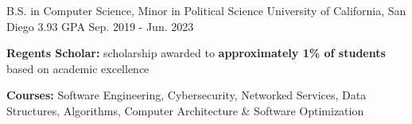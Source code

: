 

\begin{cventries}

    \cventry
    {B.S. in Computer Science, Minor in Political Science} %
    {University of California, San Diego} %
    {3.93 GPA} %
    {Sep. 2019 - Jun. 2023} %
    {
      \begin{cvitems} %
        \item {\textbf{Regents Scholar:} scholarship awarded to \textbf{approximately 1\% of students} based on academic excellence}
        \item {\textbf{Courses:} Software Engineering, Cybersecurity, Networked Services, Data Structures, Algorithms, Computer Architecture \& Software Optimization}
      \end{cvitems}
    }

\end{cventries}
